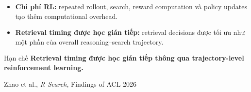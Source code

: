 \begin{frame}
\begin{itemize}
        \item \textbf{Chi phí RL:}
        repeated rollout, search, reward computation và
        policy updates tạo thêm computational overhead.

        \item \textbf{Retrieval timing được học gián tiếp:}
        retrieval decisions được tối ưu như một phần của
        overall reasoning--search trajectory.

    \end{itemize}

    \vspace{0.08cm}

    \begin{block}{Hạn chế}
        \centering
        \textbf{Retrieval timing được học gián tiếp thông qua
        trajectory-level reinforcement learning.}
    \end{block}

    \vspace{0.02cm}

    \begin{center}
        \scriptsize
        Zhao et al., \textit{R-Search}, Findings of ACL 2026
    \end{center}

\end{frame}



